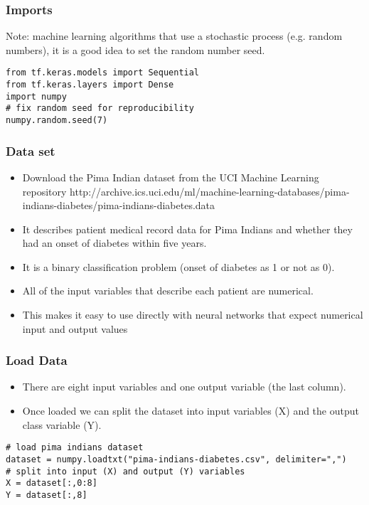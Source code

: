 \begin{frame}[fragile] \frametitle{Imports}
Note: machine learning algorithms that use a stochastic process (e.g. random numbers), it is a good idea to set the random number seed.
\begin{lstlisting}
from tf.keras.models import Sequential
from tf.keras.layers import Dense
import numpy
# fix random seed for reproducibility
numpy.random.seed(7)
\end{lstlisting}
\end{frame}

\begin{frame}[fragile] \frametitle{Data set}
 \begin{itemize}
 \item  Download the Pima Indian dataset from the UCI Machine Learning repository http://archive.ics.uci.edu/ml/machine-learning-databases/pima-indians-diabetes/pima-indians-diabetes.data 
\item  It describes patient medical record data for Pima Indians and whether they had an onset of diabetes within five years.
\item  It is a binary classification problem (onset of diabetes as 1 or not as 0). 
\item All of the input variables that describe each patient are numerical. 
\item This makes it easy to use directly with neural networks that expect numerical input and output values
\end{itemize}
\end{frame}

\begin{frame}[fragile] \frametitle{Load Data}
 \begin{itemize}
\item  There are eight input variables and one output variable (the last column).
\item Once loaded we can split the dataset into input variables (X) and the output class variable (Y).
\end{itemize}
\begin{lstlisting}
# load pima indians dataset
dataset = numpy.loadtxt("pima-indians-diabetes.csv", delimiter=",")
# split into input (X) and output (Y) variables
X = dataset[:,0:8]
Y = dataset[:,8]
\end{lstlisting}
\end{frame}

